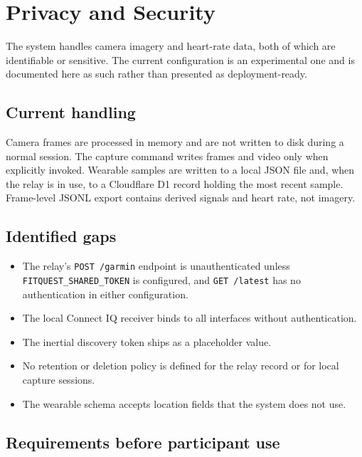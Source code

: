 \documentclass[11pt,a4paper]{article}
\newcommand{\code}[1]{\texttt{\small #1}}
\begin{document}
\section{Privacy and Security}
\label{sec:privacy}

The system handles camera imagery and heart-rate data, both of which are
identifiable or sensitive. The current configuration is an experimental one and
is documented here as such rather than presented as deployment-ready.

\subsection{Current handling}

Camera frames are processed in memory and are not written to disk during a normal
session. The capture command writes frames and video only when explicitly
invoked. Wearable samples are written to a local JSON file and, when the relay is
in use, to a Cloudflare D1 record holding the most recent sample. Frame-level
JSONL export contains derived signals and heart rate, not imagery.

\subsection{Identified gaps}

\begin{itemize}
\item The relay's \code{POST /garmin} endpoint is unauthenticated unless
      \code{FITQUEST\_SHARED\_TOKEN} is configured, and \code{GET /latest} has no
      authentication in either configuration.
\item The local Connect IQ receiver binds to all interfaces without
      authentication.
\item The inertial discovery token ships as a placeholder value.
\item No retention or deletion policy is defined for the relay record or for
      local capture sessions.
\item The wearable schema accepts location fields that the system does not use.
\end{itemize}

\subsection{Requirements before participant use}
\end{document}
